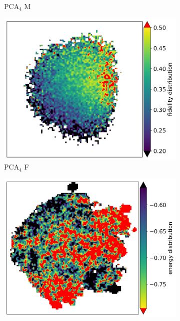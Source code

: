 \documentclass{article} %
\begin{document}
\begin{figure}[ht]
\begin{subfigure}{0.14\textwidth}
        \caption{PCA$_4$ M}
        \label{fig:Prev PCA-4 Maxcut}
    \end{subfigure}
    \begin{subfigure}{0.14\textwidth}
        \centering
        \includegraphics[width=\textwidth]{images/fidelity-model-circuits_4_qubits_gsqas_full_embedding_full_embedding_smooth.png}
        \caption{PCA$_4$ F}
        \label{fig:Prev PCA-4 Fidelity}
    \end{subfigure}
    \begin{subfigure}{0.14\textwidth}
        \centering
        \includegraphics[width=\textwidth]{images/tsqe/vqe-model-circuits_4_qubits_gsqas_full_embedding_full_embedding_smooth.png}

\end{subfigure}
\end{figure}
\end{document}
